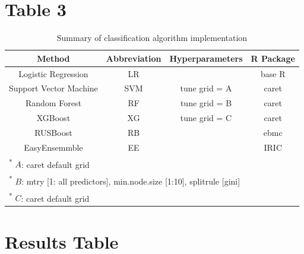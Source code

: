 \documentclass[
]{article}
\begin{document}
\newpage

\hypertarget{table-3}{%
\section{Table 3}\label{table-3}}

\begin{table}[!h]

\caption{\label{tab:tab:table}Summary of classification algorithm implementation}
\centering
\begin{tabular}[t]{cccc}
\toprule
Method & Abbreviation & Hyperparameters & R Package\\
\midrule
Logistic Regression & LR &  & base R \cite{r}\\
\addlinespace
Support Vector Machine & SVM & tune grid = A & caret \cite{caret}\\
\addlinespace
Random Forest & RF & tune grid = B & caret \cite{caret}\\
\addlinespace
XGBoost & XG & tune grid = C & caret \cite{caret}\\
\addlinespace
RUSBoost & RB &  & ebmc \cite{ebmc}\\
\addlinespace
EasyEnsemmble & EE &  & IRIC \cite{iric}\\
\bottomrule
\multicolumn{4}{l}{\rule{0pt}{1em}\textsuperscript{*}     $A$: caret default grid}\\
\multicolumn{4}{l}{\rule{0pt}{1em}\textsuperscript{*}     $B$: mtry [1: all predictors], min.node.size [1:10], splitrule [gini]}\\
\multicolumn{4}{l}{\rule{0pt}{1em}\textsuperscript{*}     $C$: caret default grid}\\
\end{tabular}
\end{table}

\newpage

\hypertarget{results-table}{%
\section{Results Table}\label{results-table}}
\end{document}
